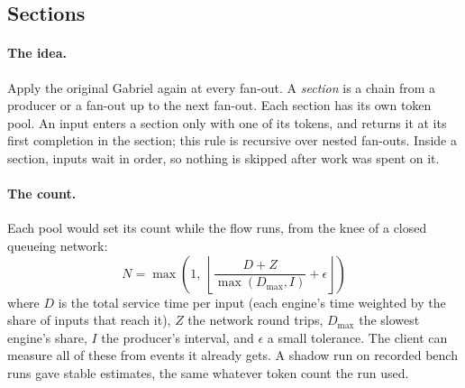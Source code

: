 \documentclass[11pt]{article}
\begin{document}
\subsection{Sections}
\label{sec:sections}

\paragraph{The idea.} Apply the original Gabriel again at every fan-out. A
\emph{section} is a chain from a producer or a fan-out up to the next
fan-out. Each section has its own token pool. An input enters a section only
with one of its tokens, and returns it at its first completion in the
section; this rule is recursive over nested fan-outs. Inside a section,
inputs wait in order, so nothing is skipped after work was spent on it.

\paragraph{The count.} Each pool would set its count while the flow runs,
from the knee of a closed queueing network:
\[
  N = \max\left(1,\ \left\lfloor \frac{D + Z}{\max(D_{\max}, I)}
  + \epsilon \right\rfloor\right)
\]
where $D$ is the total service time per input (each engine's time weighted by
the share of inputs that reach it), $Z$ the network round trips, $D_{\max}$
the slowest engine's share, $I$ the producer's interval, and $\epsilon$ a
small tolerance. The client can measure all of these from events it already
gets. A shadow run on recorded bench runs gave stable estimates, the same
whatever token count the run used.
\end{document}
